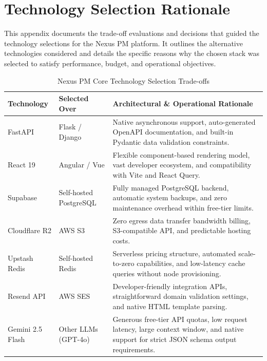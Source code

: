 \chapter{Technology Selection Rationale}
\label{app:technology-selection}

This appendix documents the trade-off evaluations and decisions that guided the technology selections for the Nexus PM platform. It outlines the alternative technologies considered and details the specific reasons why the chosen stack was selected to satisfy performance, budget, and operational objectives.

\begin{table}[h!]
\centering
\small
\renewcommand{\arraystretch}{1.5}
\begin{tabularx}{\textwidth}{l l X}
    \toprule[1.5pt]
    \rowcolor{primary!5}
    \textbf{\color{primary}Technology} & \textbf{\color{primary}Selected Over} & \textbf{\color{primary}Architectural \& Operational Rationale} \\
    \midrule
    FastAPI & Flask / Django & Native asynchronous support, auto-generated OpenAPI documentation, and built-in Pydantic data validation constraints. \\
    React 19 & Angular / Vue & Flexible component-based rendering model, vast developer ecosystem, and compatibility with Vite and React Query. \\
    Supabase & Self-hosted PostgreSQL & Fully managed PostgreSQL backend, automatic system backups, and zero maintenance overhead within free-tier limits. \\
    Cloudflare R2 & AWS S3 & Zero egress data transfer bandwidth billing, S3-compatible API, and predictable hosting costs. \\
    Upstash Redis & Self-hosted Redis & Serverless pricing structure, automated scale-to-zero capabilities, and low-latency cache queries without node provisioning. \\
    Resend API & AWS SES & Developer-friendly integration APIs, straightforward domain validation settings, and native HTML template parsing. \\
    Gemini 2.5 Flash & Other LLMs (GPT-4o) & Generous free-tier API quotas, low request latency, large context window, and native support for strict JSON schema output requirements. \\
    \bottomrule[1.5pt]
\end{tabularx}
\caption{Nexus PM Core Technology Selection Trade-offs}
\label{tab:technology_selection_matrix}
\end{table}

